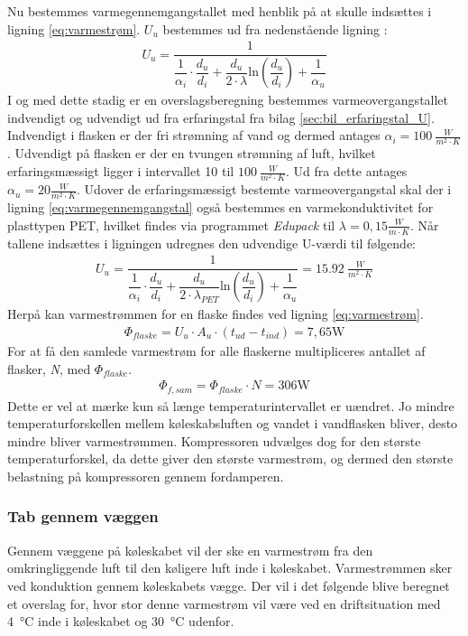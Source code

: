 \documentclass[../Hovedrapport.tex]{subfiles}
\begin{document}
Nu bestemmes varmegennemgangstallet med henblik på at skulle indsættes i ligning \ref{eq:varmestrøm}. $U_u$ bestemmes ud fra nedenstående ligning \citep{termo}:
\begin{align}
    \label{eq:varmegennemgangstal}
    U_u=\dfrac{1}{\dfrac{1}{\alpha_i}\cdot \dfrac{d_u}{d_i}+\dfrac{d_u}{2\cdot \lambda}\text{ln}\left(\dfrac{d_u}{d_i} \right)+\dfrac{1}{\alpha_u}}
\end{align}
I og med dette stadig er en overslagsberegning bestemmes varmeovergangstallet indvendigt og udvendigt ud fra erfaringstal fra bilag \ref{sec:bil_erfaringstal_U}. Indvendigt i flasken er der fri strømning af vand og dermed antages $\alpha_i=\SI{100}{\frac{W}{m^2 \cdot K}}$. Udvendigt på flasken er der en tvungen strømning af luft, hvilket erfaringsmæssigt ligger i intervallet 10 til $\SI{100}{\frac{W}{m^2 \cdot K}}$. Ud fra dette antages $\alpha_u=20\si{\frac{W}{m^2 \cdot K}}$. Udover de erfaringsmæssigt bestemte varmeovergangstal skal der i ligning \ref{eq:varmegennemgangstal} også bestemmes en varmekonduktivitet for plasttypen PET, hvilket findes via programmet \textit{Edupack} til $\lambda=0,15\si{\frac{W}{m \cdot K}}$. Når tallene indsættes i ligningen udregnes den udvendige U-værdi til følgende:
\begin{align}
    U_u=\dfrac{1}{\dfrac{1}{\alpha_i}\cdot \dfrac{d_u}{d_i}+\dfrac{d_u}{2\cdot \lambda_{PET}}\text{ln}\left(\dfrac{d_u}{d_i} \right)+\dfrac{1}{\alpha_u}}=\SI{15,92}{\frac{W}{m^2 \cdot K}}
\end{align}
Herpå kan varmestrømmen for en flaske findes ved ligning \ref{eq:varmestrøm}.
\begin{align}
    \Phi_{flaske}=U_u \cdot A_u \cdot (t_{ud}-t_{ind})=7,65 \si{\watt}
\end{align}
For at få den samlede varmestrøm for alle flaskerne multipliceres antallet af flasker, \textit{N}, med $\Phi_{flaske}$.
\begin{align}
    \label{eq:flaske_samlet}
    \Phi_{f,sam}=\Phi_{flaske}\cdot N=306 \si{\watt}
\end{align}
Dette er vel at mærke kun så længe temperaturintervallet er uændret. Jo mindre temperaturforskellen mellem køleskabsluften og vandet i vandflasken bliver, desto mindre bliver varmestrømmen. Kompressoren udvælges dog for den største temperaturforskel, da dette giver den største varmestrøm, og dermed den største belastning på kompressoren gennem fordamperen.
\subsubsection*{Tab gennem væggen}
Gennem væggene på køleskabet vil der ske en varmestrøm fra den omkringliggende luft til den køligere luft inde i køleskabet. Varmestrømmen sker ved konduktion gennem køleskabets vægge. Der vil i det følgende blive beregnet et overslag for, hvor stor denne varmestrøm vil være ved en driftsituation med \SI{4}{\celsius} inde i køleskabet og \SI{30}{\celsius} udenfor.
\end{document}
